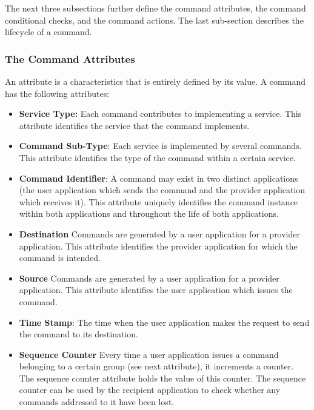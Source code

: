 The next three subsections further define the command attributes, the command conditional checks, and the command actions. The last sub-section describes the lifecycle of a command. 

\subsubsection{The Command Attributes}\label{sec:CmdAttributes}

An attribute is a characteristics that is entirely defined by its value. 
A command has the following attributes:

\begin{itemize}
\item \textbf{Service Type:} Each command contributes to implementing a service. This attribute identifies the service that the command implements. 

\item \textbf{Command Sub-Type}: Each service is implemented by several commands. 
This attribute identifies the type of the command within a certain service. 

\item \textbf{Command Identifier}: A command may exist in two distinct applications (the user application which sends the command and the provider application which receives it). This attribute uniquely identifies the command instance within both applications and throughout the life of both applications.

\item \textbf{Destination} Commands are generated by a user application for a provider application. This attribute identifies the provider application for which the command is intended.

\item \textbf{Source}
Commands are generated by a user application for a provider application. This attribute identifies the user application which issues the command.

\item \textbf{Time Stamp}:
The time when the user application makes the request to send the command to its destination. 

\item \textbf{Sequence Counter}
Every time a user application issues a command belonging to a certain group (see next attribute), it increments a counter. The sequence counter attribute holds the value of this counter. The sequence counter can be used by the recipient application to check whether any commands addressed to it have been lost. 


\end{itemize}
